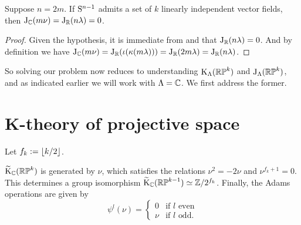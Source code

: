 \begin{lemma}
  \label{j-reduction}
  Suppose $n = 2m$. If $\S^{n-1}$ admits a set of $k$ linearly
  independent vector fields, then $\J_\C(m\nu) = \J_\R(n\lambda) = 0$.
\end{lemma}

\begin{proof}
  Given the hypothesis, it is immediate from 
  and  that $\J_\R(n\lambda) = 0$. And by
  definition we have $\J_\C(m\nu) = \J_\R(\iota(\kappa(m\lambda))) =
  \J_\R(2m\lambda) = \J_\R(n\lambda)$.
\end{proof}

So solving our problem now reduces to understanding
$\K_\Lambda(\RP^k)$ and $\J_\Lambda(\RP^k)$, and as indicated earlier
we will work with $\Lambda = \C$. We first address the former.


\section{K-theory of projective space}

\begin{notation}
  \label{kthy-order}
  Let $f_k \ce \lfloor k/2 \rfloor$.
\end{notation}

\begin{theorem}
  \label{RP-kthy}
  $\wt\K_\C(\RP^k)$ is generated by $\nu$, which satisfies the
  relations $\nu^2 = -2\nu$ and $\nu^{f_k+1} = 0$. This determines a
  group isomorphism $\wt\K_\C(\RP^{k-1}) \simeq \Z/2^{f_k}$.  Finally,
  the Adams operations are given by
  \[
  \psi^l(\nu) =
  \begin{cases}
    0 & \text{if }l\text{ even} \\
    \nu & \text{if }l\text{ odd}.
  \end{cases}
  \]
\end{theorem}

